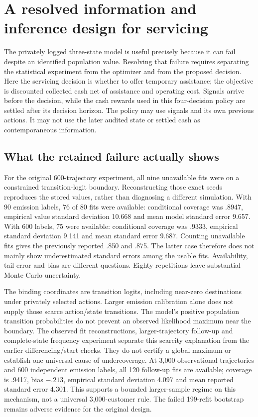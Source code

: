 \section{A resolved information and inference design for servicing}
\label{s6:servicing}
The privately logged three-state model is useful precisely because it can
fail despite an identified population value. Resolving that failure requires
separating the statistical experiment from the optimizer and from the
proposed decision. Here the servicing decision is whether to offer temporary
assistance; the objective is discounted collected cash net of assistance and
operating cost. Signals arrive before the decision, while the cash rewards
used in this four-decision policy are settled after its decision horizon.
The policy may use signals and its own previous actions. It may not use the
later audited state or settled cash as contemporaneous information.

\subsection{What the retained failure actually shows}
For the original 600-trajectory experiment, all nine unavailable fits were
on a constrained transition-logit boundary. Reconstructing those exact seeds
reproduces the stored values, rather than diagnosing a different simulation.
With 90 emission labels, 76 of 80 fits were available: conditional coverage
was .8947, empirical value standard deviation 10.668 and mean model standard
error 9.657. With 600 labels, 75 were available: conditional coverage was
.9333, empirical standard deviation 9.141 and mean standard error 9.687.
Counting unavailable fits gives the previously reported .850 and .875.
The latter case therefore does not mainly show underestimated standard
errors among the usable fits. Availability, tail error and bias are different
questions. Eighty repetitions leave substantial Monte Carlo uncertainty.

The binding coordinates are transition logits, including near-zero
destinations under privately selected actions. Larger emission calibration
alone does not supply those scarce action/state transitions. The model's
positive population transition probabilities do not prevent an observed
likelihood maximum near the boundary. The observed fit reconstructions,
larger-trajectory follow-up and complete-state frequency experiment separate
this scarcity explanation from the earlier differencing/start checks. They
do not certify a global maximum or establish one universal cause of
undercoverage. At 3,000 observational trajectories and 600 independent
emission labels, all 120 follow-up fits are available; coverage is .9417,
bias $-.213$, empirical standard deviation 4.097 and mean reported standard
error 4.301. This supports a bounded larger-sample regime on this mechanism,
not a universal 3,000-customer rule. The failed 199-refit bootstrap remains
adverse evidence for the original design.

